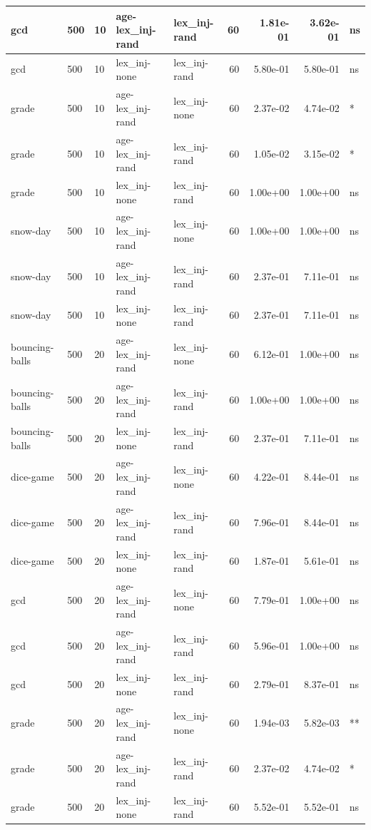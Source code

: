 \documentclass[
]{book}
\begin{document}
\begin{table}
\begin{tabular}[t]{l|l|l|l|l|r|r|r|l}
\hline
gcd & 500 & 10 & age-lex\_inj-rand & lex\_inj-rand & 60 & 1.81e-01 & 3.62e-01 & ns\\
\hline
gcd & 500 & 10 & lex\_inj-none & lex\_inj-rand & 60 & 5.80e-01 & 5.80e-01 & ns\\
\hline
grade & 500 & 10 & age-lex\_inj-rand & lex\_inj-none & 60 & 2.37e-02 & 4.74e-02 & *\\
\hline
grade & 500 & 10 & age-lex\_inj-rand & lex\_inj-rand & 60 & 1.05e-02 & 3.15e-02 & *\\
\hline
grade & 500 & 10 & lex\_inj-none & lex\_inj-rand & 60 & 1.00e+00 & 1.00e+00 & ns\\
\hline
snow-day & 500 & 10 & age-lex\_inj-rand & lex\_inj-none & 60 & 1.00e+00 & 1.00e+00 & ns\\
\hline
snow-day & 500 & 10 & age-lex\_inj-rand & lex\_inj-rand & 60 & 2.37e-01 & 7.11e-01 & ns\\
\hline
snow-day & 500 & 10 & lex\_inj-none & lex\_inj-rand & 60 & 2.37e-01 & 7.11e-01 & ns\\
\hline
bouncing-balls & 500 & 20 & age-lex\_inj-rand & lex\_inj-none & 60 & 6.12e-01 & 1.00e+00 & ns\\
\hline
bouncing-balls & 500 & 20 & age-lex\_inj-rand & lex\_inj-rand & 60 & 1.00e+00 & 1.00e+00 & ns\\
\hline
bouncing-balls & 500 & 20 & lex\_inj-none & lex\_inj-rand & 60 & 2.37e-01 & 7.11e-01 & ns\\
\hline
dice-game & 500 & 20 & age-lex\_inj-rand & lex\_inj-none & 60 & 4.22e-01 & 8.44e-01 & ns\\
\hline
dice-game & 500 & 20 & age-lex\_inj-rand & lex\_inj-rand & 60 & 7.96e-01 & 8.44e-01 & ns\\
\hline
dice-game & 500 & 20 & lex\_inj-none & lex\_inj-rand & 60 & 1.87e-01 & 5.61e-01 & ns\\
\hline
gcd & 500 & 20 & age-lex\_inj-rand & lex\_inj-none & 60 & 7.79e-01 & 1.00e+00 & ns\\
\hline
gcd & 500 & 20 & age-lex\_inj-rand & lex\_inj-rand & 60 & 5.96e-01 & 1.00e+00 & ns\\
\hline
gcd & 500 & 20 & lex\_inj-none & lex\_inj-rand & 60 & 2.79e-01 & 8.37e-01 & ns\\
\hline
grade & 500 & 20 & age-lex\_inj-rand & lex\_inj-none & 60 & 1.94e-03 & 5.82e-03 & **\\
\hline
grade & 500 & 20 & age-lex\_inj-rand & lex\_inj-rand & 60 & 2.37e-02 & 4.74e-02 & *\\
\hline
grade & 500 & 20 & lex\_inj-none & lex\_inj-rand & 60 & 5.52e-01 & 5.52e-01 & ns\\

\end{tabular}
\end{table}
\end{document}
